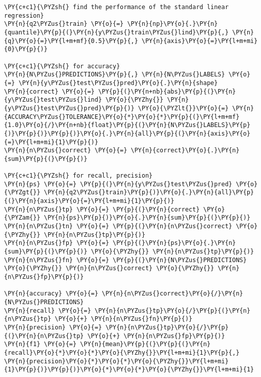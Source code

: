     \begin{tcolorbox}[breakable, size=fbox, boxrule=1pt, pad at break*=1mm,colback=cellbackground, colframe=cellborder]
\begin{Verbatim}[commandchars=\\\{\}]
\PY{c+c1}{\PYZsh{} find the performance of the standard linear regression}
\PY{n}{q2\PYZus{}train} \PY{o}{=} \PY{n}{np}\PY{o}{.}\PY{n}{quantile}\PY{p}{(}\PY{n}{y\PYZus{}train\PYZus{}lind}\PY{p}{,} \PY{n}{q}\PY{o}{=}\PY{l+m+mf}{0.5}\PY{p}{,} \PY{n}{axis}\PY{o}{=}\PY{l+m+mi}{0}\PY{p}{)}

\PY{c+c1}{\PYZsh{} for accuracy}
\PY{n}{N\PYZus{}PREDICTIONS}\PY{p}{,} \PY{n}{N\PYZus{}LABELS} \PY{o}{=} \PY{n}{y\PYZus{}test\PYZus{}pred}\PY{o}{.}\PY{n}{shape}
\PY{n}{correct} \PY{o}{=} \PY{p}{(}\PY{n+nb}{abs}\PY{p}{(}\PY{n}{y\PYZus{}test\PYZus{}lind} \PY{o}{\PYZhy{}} \PY{n}{y\PYZus{}test\PYZus{}pred}\PY{p}{)} \PY{o}{\PYZlt{}}\PY{o}{=} \PY{n}{ACCURACY\PYZus{}TOLERANCE}\PY{o}{*}\PY{o}{*}\PY{p}{(}\PY{l+m+mf}{1.0}\PY{o}{/}\PY{n+nb}{float}\PY{p}{(}\PY{n}{N\PYZus{}LABELS}\PY{p}{)}\PY{p}{)}\PY{p}{)}\PY{o}{.}\PY{n}{all}\PY{p}{(}\PY{n}{axis}\PY{o}{=}\PY{l+m+mi}{1}\PY{p}{)}
\PY{n}{n\PYZus{}correct} \PY{o}{=} \PY{n}{correct}\PY{o}{.}\PY{n}{sum}\PY{p}{(}\PY{p}{)}

\PY{c+c1}{\PYZsh{} for recall, precision}
\PY{n}{ps} \PY{o}{=} \PY{p}{(}\PY{n}{y\PYZus{}test\PYZus{}pred} \PY{o}{\PYZgt{}} \PY{n}{q2\PYZus{}train}\PY{p}{)}\PY{o}{.}\PY{n}{all}\PY{p}{(}\PY{n}{axis}\PY{o}{=}\PY{l+m+mi}{1}\PY{p}{)}
\PY{n}{n\PYZus{}tp} \PY{o}{=} \PY{p}{(}\PY{n}{correct} \PY{o}{\PYZam{}} \PY{n}{ps}\PY{p}{)}\PY{o}{.}\PY{n}{sum}\PY{p}{(}\PY{p}{)}
\PY{n}{n\PYZus{}tn} \PY{o}{=} \PY{p}{(}\PY{n}{n\PYZus{}correct} \PY{o}{\PYZhy{}} \PY{n}{n\PYZus{}tp}\PY{p}{)}
\PY{n}{n\PYZus{}fp} \PY{o}{=} \PY{p}{(}\PY{n}{ps}\PY{o}{.}\PY{n}{sum}\PY{p}{(}\PY{p}{)} \PY{o}{\PYZhy{}} \PY{n}{n\PYZus{}tp}\PY{p}{)}
\PY{n}{n\PYZus{}fn} \PY{o}{=} \PY{p}{(}\PY{n}{N\PYZus{}PREDICTIONS} \PY{o}{\PYZhy{}} \PY{n}{n\PYZus{}correct} \PY{o}{\PYZhy{}} \PY{n}{n\PYZus{}fp}\PY{p}{)}

\PY{n}{accuracy} \PY{o}{=} \PY{n}{n\PYZus{}correct}\PY{o}{/}\PY{n}{N\PYZus{}PREDICTIONS}
\PY{n}{recall} \PY{o}{=} \PY{n}{n\PYZus{}tp}\PY{o}{/}\PY{p}{(}\PY{n}{n\PYZus{}tp} \PY{o}{+} \PY{n}{n\PYZus{}fn}\PY{p}{)}
\PY{n}{precision} \PY{o}{=} \PY{n}{n\PYZus{}tp}\PY{o}{/}\PY{p}{(}\PY{n}{n\PYZus{}tp} \PY{o}{+} \PY{n}{n\PYZus{}fp}\PY{p}{)}
\PY{n}{f1} \PY{o}{=} \PY{n}{mean}\PY{p}{(}\PY{p}{(}\PY{n}{recall}\PY{o}{*}\PY{o}{*}\PY{o}{\PYZhy{}}\PY{l+m+mi}{1}\PY{p}{,} \PY{n}{precision}\PY{o}{*}\PY{o}{*}\PY{o}{\PYZhy{}}\PY{l+m+mi}{1}\PY{p}{)}\PY{p}{)}\PY{o}{*}\PY{o}{*}\PY{o}{\PYZhy{}}\PY{l+m+mi}{1}


\end{Verbatim}
\end{tcolorbox}

